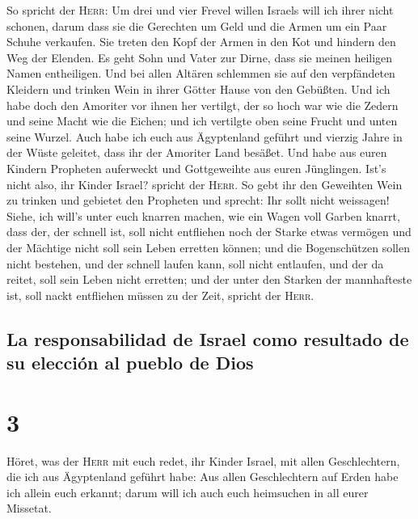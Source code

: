  So spricht der \textsc{Herr}: Um drei und vier Frevel
willen Israels will ich ihrer nicht schonen, darum dass sie die
Gerechten um Geld und die Armen um ein Paar Schuhe verkaufen.
 Sie treten den Kopf der Armen in den Kot und hindern den
Weg der Elenden. Es geht Sohn und Vater zur Dirne, dass sie meinen
heiligen Namen entheiligen.  Und bei allen Altären
schlemmen sie auf den verpfändeten Kleidern und trinken Wein in ihrer
Götter Hause von den Gebüßten.  Und ich habe doch den
Amoriter vor ihnen her vertilgt, der so hoch war wie die Zedern und
seine Macht wie die Eichen; und ich vertilgte oben seine Frucht und
unten seine Wurzel.  Auch habe ich euch aus Ägyptenland
geführt und vierzig Jahre in der Wüste geleitet, dass ihr der Amoriter
Land besäßet.  Und habe aus euren Kindern Propheten
auferweckt und Gottgeweihte aus euren Jünglingen. Ist's nicht also, ihr
Kinder Israel? spricht der \textsc{Herr}.  So gebt ihr
den Geweihten Wein zu trinken und gebietet den Propheten und sprecht:
Ihr sollt nicht weissagen!  Siehe, ich will's unter euch
knarren machen, wie ein Wagen voll Garben knarrt,  dass
der, der schnell ist, soll nicht entfliehen noch der Starke etwas
vermögen und der Mächtige nicht soll sein Leben erretten können;
 und die Bogenschützen sollen nicht bestehen, und der
schnell laufen kann, soll nicht entlaufen, und der da reitet, soll sein
Leben nicht erretten;  und der unter den Starken der
mannhafteste ist, soll nackt entfliehen müssen zu der Zeit, spricht der
\textsc{Herr}.

\hypertarget{la-responsabilidad-de-israel-como-resultado-de-su-elecciuxf3n-al-pueblo-de-dios}{%
\subsection{La responsabilidad de Israel como resultado de su elección
al pueblo de
Dios}\label{la-responsabilidad-de-israel-como-resultado-de-su-elecciuxf3n-al-pueblo-de-dios}}

\hypertarget{section-2}{%
\section{3}\label{section-2}}

 Höret, was der \textsc{Herr} mit euch redet, ihr Kinder
Israel, mit allen Geschlechtern, die ich aus Ägyptenland geführt habe:
 Aus allen Geschlechtern auf Erden habe ich allein euch
erkannt; darum will ich auch euch heimsuchen in all eurer Missetat.

